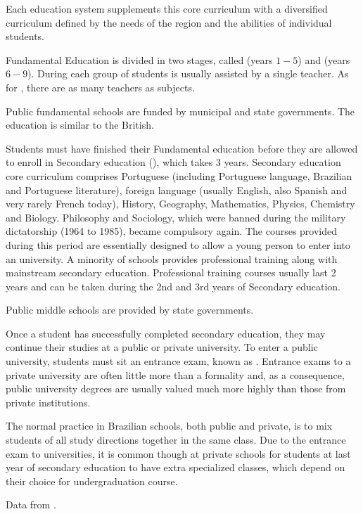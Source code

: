 Each education system supplements this core curriculum with a diversified curriculum defined by the needs of the region and the abilities of individual students.

Fundamental Education is divided in two stages, called  (years $1-5$) and  (years $6-9$). During  each group of students is usually assisted by a single teacher. As for , there are as many teachers as subjects.

Public fundamental schools are funded by municipal and state governments. The education is similar to the British.

Students must have finished their Fundamental education before they are allowed to enroll in Secondary education (), which takes 3 years. Secondary education core curriculum comprises Portuguese (including Portuguese language, Brazilian and Portuguese literature), foreign language (usually English, also Spanish and very rarely French today), History, Geography, Mathematics, Physics, Chemistry and Biology. Philosophy and Sociology, which were banned during the military dictatorship (1964 to 1985), became compulsory again. The courses provided during this period are essentially designed to allow a young person to enter into an university. A minority of schools provides professional training along with mainstream secondary education. Professional training courses usually last 2 years and can be taken during the 2nd and 3rd years of Secondary education.

Public middle schools are provided by state governments.

Once a student has successfully completed secondary education, they may continue their studies at a public or private university. To enter a public university, students must sit an entrance exam, known as . Entrance exams to a private university are often little more than a formality and, as a consequence, public university degrees are usually valued much more highly than those from private institutions.

The normal practice in Brazilian schools, both public and private, is to mix students of all study directions together in the same class. Due to the entrance exam to universities, it is common though at private schools for students at last year of secondary education to have extra specialized classes, which depend on their choice for undergraduation course.

Data from \cite{WikiEducationInBrazil}.


